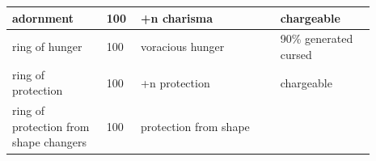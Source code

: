 \begin{longtable}{|>{\RaggedRight}p{0.23487\linewidth}|>{\RaggedRight}p{0.07372\linewidth}|>{\RaggedRight}p{0.34225\linewidth}|>{\RaggedRight}p{0.23487\linewidth}|}
adornment\footnotemark[48]&\hspace*{0pt}\ignorespaces{}\hspace*{0pt}100&\hspace*{0pt}\ignorespaces{}\hspace*{0pt}+n charisma\footnotemark[49]&\hspace*{0pt}\ignorespaces{}\hspace*{0pt}chargeable\\ \hline \hspace*{0pt}\ignorespaces{}\hspace*{0pt}ring of hunger\footnotemark[50]&\hspace*{0pt}\ignorespaces{}\hspace*{0pt}100&\hspace*{0pt}\ignorespaces{}\hspace*{0pt}voracious hunger\footnotemark[51]&\hspace*{0pt}\ignorespaces{}\hspace*{0pt}90\% generated cursed\\ \hline \hspace*{0pt}\ignorespaces{}\hspace*{0pt}ring of protection\footnotemark[52]&\hspace*{0pt}\ignorespaces{}\hspace*{0pt}100&\hspace*{0pt}\ignorespaces{}\hspace*{0pt}+n protection\footnotemark[53]&\hspace*{0pt}\ignorespaces{}\hspace*{0pt}chargeable\\ \hline \hspace*{0pt}\ignorespaces{}\hspace*{0pt}ring of protection from shape changers\footnotemark[54]&\hspace*{0pt}\ignorespaces{}\hspace*{0pt}100&\hspace*{0pt}\ignorespaces{}\hspace*{0pt}protection from shape 
\end{longtable}
